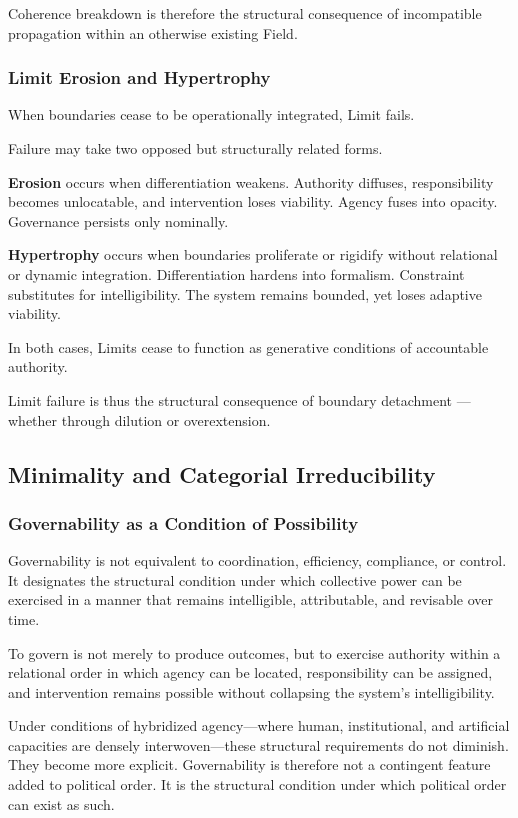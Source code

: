 \documentclass[12pt]{article}
\begin{document}
Coherence breakdown is therefore the structural consequence of incompatible propagation within an otherwise existing Field.

\subsubsection{Limit Erosion and Hypertrophy}


When boundaries cease to be operationally integrated, Limit fails.

Failure may take two opposed but structurally related forms.

\textbf{Erosion} occurs when differentiation weakens. Authority diffuses, responsibility becomes unlocatable, and intervention loses viability. Agency fuses into opacity. Governance persists only nominally.

\textbf{Hypertrophy} occurs when boundaries proliferate or rigidify without relational or dynamic integration. Differentiation hardens into formalism. Constraint substitutes for intelligibility. The system remains bounded, yet loses adaptive viability.

In both cases, Limits cease to function as generative conditions of accountable authority.

Limit failure is thus the structural consequence of boundary detachment — whether through dilution or overextension.


\subsection{Minimality and Categorial Irreducibility}


\subsubsection{Governability as a Condition of Possibility}


Governability is not equivalent to coordination, efficiency, compliance, or control. It designates the structural condition under which collective power can be exercised in a manner that remains intelligible, attributable, and revisable over time.

To govern is not merely to produce outcomes, but to exercise authority within a relational order in which agency can be located, responsibility can be assigned, and intervention remains possible without collapsing the system’s intelligibility.

Under conditions of hybridized agency—where human, institutional, and artificial capacities are densely interwoven—these structural requirements do not diminish. They become more explicit. Governability is therefore not a contingent feature added to political order. It is the structural condition under which political order can exist as such.
\end{document}
